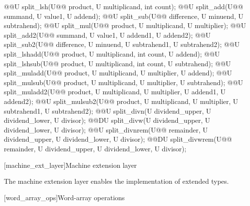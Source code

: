 \begin{addedblock}
\begin{itemdecl}
@@U split_lsh(U@\tcode{\remmodif{*}\addmodif{\&}}@ product, U multiplicand, int count);
@@U split_add(U@\tcode{\remmodif{*}\addmodif{\&}}@ summand, U value1, U addend);
@@U split_sub(U@\tcode{\remmodif{*}\addmodif{\&}}@ difference, U minuend, U subtrahend);
@@U split_mul(U@\tcode{\remmodif{*}\addmodif{\&}}@ product, U multiplicand, U multiplier);
@@U split_add2(U@\tcode{\remmodif{*}\addmodif{\&}}@ summand, U value1, U addend1, U addend2);
@@U split_sub2(U@\tcode{\remmodif{*}\addmodif{\&}}@ difference, U minuend, U subtrahend1, U subtrahend2);
@@U split_lshadd(U@\tcode{\remmodif{*}\addmodif{\&}}@ product, U multiplicand, int count, U addend);
@@U split_lshsub(U@\tcode{\remmodif{*}\addmodif{\&}}@ product, U multiplicand, int count, U subtrahend);
@@U split_muladd(U@\tcode{\remmodif{*}\addmodif{\&}}@ product, U multiplicand, U multiplier, U addend);
@@U split_mulsub(U@\tcode{\remmodif{*}\addmodif{\&}}@ product, U multiplicand, U multiplier, U subtrahend);
@@U split_muladd2(U@\tcode{\remmodif{*}\addmodif{\&}}@ product, U multiplicand, U multiplier, U addend1, U addend2);
@@U split_mulsub2(U@\tcode{\remmodif{*}\addmodif{\&}}@ product, U multiplicand, U multiplier, U subtrahend1, U subtrahend2);
@@U split_divn(U dividend_upper, U dividend_lower, U divisor);
@@DU split_divw(U dividend_upper, U dividend_lower, U divisor);
@@U split_divnrem(U@\tcode{\remmodif{*}\addmodif{\&}}@ remainder, U dividend_upper, U dividend_lower, U divisor);
@@DU split_divwrem(U@\tcode{\remmodif{*}\addmodif{\&}}@ remainder, U dividend_upper, U dividend_lower, U divisor);
\end{itemdecl}

[machine_ext_layer]{Machine extension layer}

The machine extension layer enables the implementation of extended types.

[word_array_ops]{Word-array operations}


\end{addedblock}
